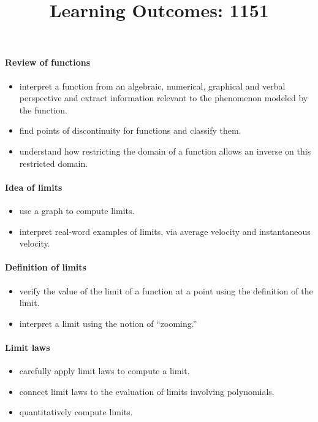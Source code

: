 \documentclass{amsart}
\title{Learning Outcomes: 1151}
\begin{document}
\maketitle


\paragraph*{Review of functions}
\begin{itemize}
\item interpret a function from an algebraic, numerical, graphical and
  verbal perspective and extract information relevant to the
  phenomenon modeled by the function.
\item find points of discontinuity for functions and classify them.
\item understand how restricting the domain of a function allows an
  inverse on this restricted domain.
\end{itemize}

\paragraph*{Idea of limits}
\begin{itemize}
\item use a graph to compute limits. 
\item interpret real-word examples of limits, via average velocity and
  instantaneous velocity.
\end{itemize}


\paragraph*{Definition of limits}
\begin{itemize}
\item verify the value of the limit of a function at a point using the
  definition of the limit.
\item interpret a limit using the notion of ``zooming.''
\end{itemize}


\paragraph*{Limit laws}
\begin{itemize}
\item carefully apply limit laws to compute a limit.
\item connect limit laws to the evaluation of limits involving
  polynomials.
\item quantitatively compute limits. 
\end{itemize}
\end{document}

